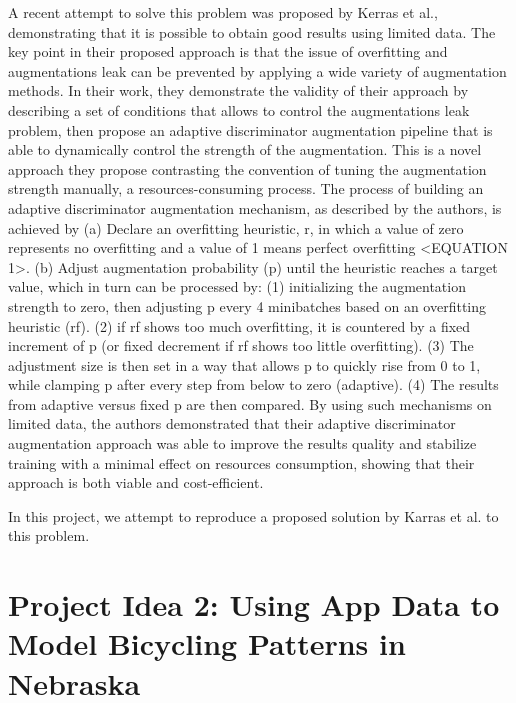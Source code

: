 \documentclass{report}
\begin{document}
A recent attempt to solve this problem was proposed by Kerras et al., demonstrating that it is possible to obtain good results using limited data. The key point in their proposed approach is that the issue of overfitting and augmentations leak can be prevented by applying a wide variety of augmentation methods. In their work, they demonstrate the validity of their approach by describing a set of conditions that allows to control the augmentations leak problem, then propose an adaptive discriminator augmentation pipeline that is able to dynamically control the strength of the augmentation. This is a novel approach they propose contrasting the convention of tuning the augmentation strength manually, a resources-consuming process. The process of building an adaptive discriminator augmentation mechanism, as described by the authors, is achieved by 
(a) Declare an overfitting heuristic, r, in which a value of zero represents no overfitting and a value of 1 means perfect overfitting <EQUATION 1>.
(b) Adjust augmentation probability (p) until the heuristic reaches a target value, which in turn can be processed by:
(1) initializing the augmentation strength to zero, then adjusting p every 4 minibatches based on an overfitting heuristic (rf).
(2) if rf shows too much overfitting, it is countered by a fixed increment of p (or fixed decrement if rf shows too little overfitting).
(3) The adjustment size is then set in a way that allows p to quickly rise from 0 to 1, while clamping p after every step from below to zero (adaptive).
(4) The results from adaptive versus ﬁxed p are then compared.
By using such mechanisms on limited data, the authors demonstrated that their adaptive discriminator augmentation approach was able to improve the results quality and stabilize training with a minimal effect on resources consumption, showing that their approach is both viable and cost-efficient.


In this project, we attempt to reproduce a proposed solution by Karras et al. to this problem. 



\section{Project Idea 2: Using App Data to Model Bicycling Patterns in Nebraska}
\end{document}
